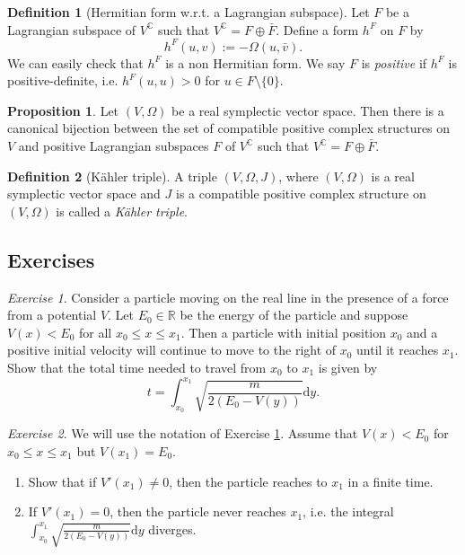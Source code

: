 \documentclass[12pt]{amsart}
\numberwithin{equation}{section}
\theoremstyle{plain}
\theoremstyle{definition}
\newtheorem{defn}{Definition}[subsection]
\newtheorem{prop}{Proposition}[subsection]
\theoremstyle{remark}
\newtheorem{exe}{Exercise}[subsection]
\newcommand{\R}{\mathbb{R}}
\newcommand{\dd}{{\mathrm{d}}}
\begin{document}
\begin{defn}[Hermitian form w.r.t. a Lagrangian subspace]
Let $F$ be a Lagrangian subspace of $V^\mathbb{C}$ such that $V^\mathbb{C}=F\oplus \bar F$. Define a form $h^F$ on $F$ by 
$$h^F(u,v):=-\Omega(u,\bar v).$$
We can easily check that $h^F$ is a non Hermitian form. We say $F$ is \emph{positive} if $h^F$ is positive-definite, i.e. $h^F(u,u)>0$ for $u\in F\setminus\{0\}$.
\end{defn}

\begin{prop}
Let $(V,\Omega)$ be a real symplectic vector space. Then there is a canonical bijection between the set of compatible positive complex structures on $V$ and positive Lagrangian subspaces $F$ of $V^\mathbb{C}$ such that $V^\mathbb{C}=F\oplus\bar F$.
\end{prop}

\begin{defn}[K\"ahler triple]
A triple $(V,\Omega,J)$, where $(V,\Omega)$ is a real symplectic vector space and $J$ is a compatible positive complex structure on $(V,\Omega)$ is called a \emph{K\"ahler triple}.
\end{defn}

\subsection{Exercises}

\begin{exe}
\label{problem1}
Consider a particle moving on the real line in the presence of a force from a potential $V$. Let $E_0\in\R$ be the energy of the particle and suppose $V(x)<E_0$ for all $x_0\leq x\leq x_1$. Then a particle with initial position $x_0$ and a positive initial velocity will continue to move to the right of $x_0$ until it reaches $x_1$. Show that the total time needed to travel from $x_0$ to $x_1$ is given by $$t=\int_{x_0}^{x_1}\sqrt{\frac{m}{2(E_0-V(y))}}\dd y.$$
\end{exe}

\begin{exe}
We will use the notation of Exercise \ref{problem1}. Assume that $V(x)<E_0$ for $x_0\leq x\leq x_1$ but $V(x_1)=E_0$.
\begin{enumerate}
\item{Show that if $V'(x_1)\not=0$, then the particle reaches to $x_1$ in a finite time.}
\item{If $V'(x_1)=0$, then the particle never reaches $x_1$, i.e. the integral $\int_{x_0}^{x_1}\sqrt{\frac{m}{2(E_0-V(y))}}\dd y$ diverges.
}
\end{enumerate}
\end{exe}
\end{document}
